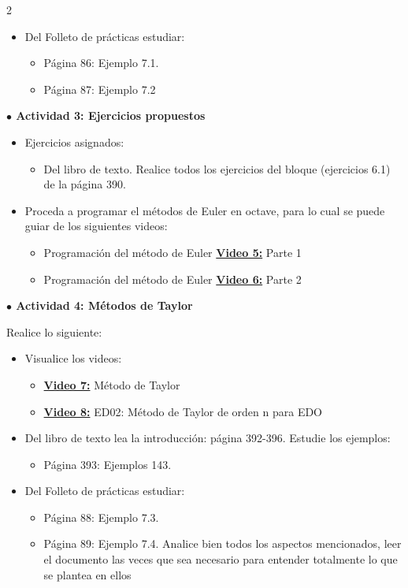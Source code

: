\documentclass[10pt,letterpaper]{article}
\newcommand{\URLVideoCinco}{\href{https://youtu.be/AmYC7WBAZPg}{\textbf{Video 5:}} Parte 1}
\newcommand{\URLVideoSeis}{\href{https://youtu.be/U32K6xWgmoA}{\textbf{Video 6:}} Parte 2}
\newcommand{\URLVideoSiete}{\href{https://youtu.be/5K-DbO3tiLU}{\textbf{Video 7:}} Método de Taylor}
\newcommand{\URLVideoOcho}{\href{https://youtu.be/sof7m9UT8oU}{\textbf{Video 8:}} ED02: Método de Taylor de orden n para EDO}
\begin{document}
\begin{multicols}{2}
\begin{itemize}
\begin{itemize}
\end{itemize}
\item Del Folleto de prácticas estudiar:
\begin{itemize}
\item Página 86: Ejemplo 7.1. 
\item Página 87: Ejemplo 7.2
\end{itemize}
\end{itemize}

{\color{actividades} \textbf{  $\bullet$ Actividad 3: Ejercicios propuestos}}
\begin{itemize}
\item Ejercicios asignados:
\begin{itemize}
\item Del libro de texto. Realice todos los ejercicios del bloque (ejercicios 6.1) de la página 390.
\end{itemize}
\item Proceda a programar el métodos de Euler en octave, para lo cual se puede guiar de los siguientes videos:
\begin{itemize}
\item Programación del método de Euler \URLVideoCinco
\item Programación del método de Euler \URLVideoSeis
\end{itemize}
\end{itemize}

{\color{actividades} \textbf{  $\bullet$ Actividad 4: Métodos de Taylor}}

Realice lo siguiente:
\begin{itemize}
\item Visualice los videos:
\begin{itemize}
\item \URLVideoSiete
\item \URLVideoOcho
\end{itemize}
\item Del libro de texto lea la introducción: página 392-396. Estudie los ejemplos:
\begin{itemize}
\item Página 393: Ejemplos 143. 
\end{itemize}
\item Del Folleto de prácticas estudiar:
\begin{itemize}
\item Página 88: Ejemplo 7.3. 
\item Página 89: Ejemplo 7.4. Analice bien todos los aspectos mencionados, leer el documento las veces que sea necesario para entender totalmente lo que se plantea en ellos
\end{itemize}
\end{itemize}


\end{multicols}
\end{document}
